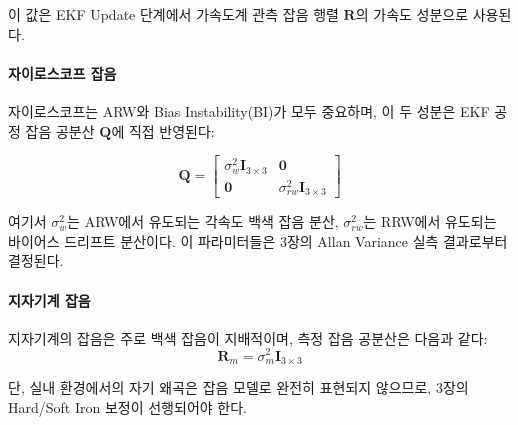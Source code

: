                 이 값은 EKF Update 단계에서 가속도계 관측 잡음 행렬 $\mathbf{R}$의 가속도 성분으로 사용된다.\\

            \paragraph{자이로스코프 잡음}
                자이로스코프는 ARW와 Bias Instability(BI)가 모두 중요하며, 이 두 성분은 EKF 공정 잡음 공분산 $\mathbf{Q}$에 직접 반영된다:

                \begin{equation}
                    \mathbf{Q} = \begin{bmatrix} \sigma_w^2 \mathbf{I}_{3\times 3} & \mathbf{0} \\ \mathbf{0} & \sigma_{rw}^2 \mathbf{I}_{3\times 3} \end{bmatrix}
                    \label{eq:gyro_Q}
                \end{equation}

                여기서 $\sigma_w^2$는 ARW에서 유도되는 각속도 백색 잡음 분산, $\sigma_{rw}^2$는 RRW에서 유도되는 바이어스 드리프트 분산이다. 이 파라미터들은 3장의 Allan Variance 실측 결과로부터 결정된다.\\

            \paragraph{지자기계 잡음}
                지자기계의 잡음은 주로 백색 잡음이 지배적이며, 측정 잡음 공분산은 다음과 같다:\\

                \begin{equation}
                    \mathbf{R}_m = \sigma_m^2 \mathbf{I}_{3\times 3}
                    \label{eq:mag_noise_cov}
                \end{equation}

                단, 실내 환경에서의 자기 왜곡은 잡음 모델로 완전히 표현되지 않으므로, 3장의 Hard/Soft Iron 보정이 선행되어야 한다.\\